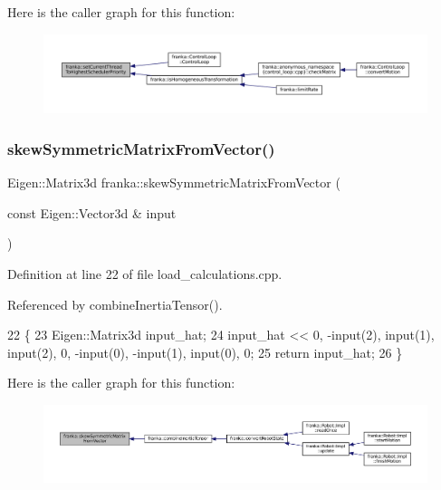 Here is the caller graph for this function\+:
\nopagebreak
\begin{figure}[H]
\begin{center}
\leavevmode
\includegraphics[width=350pt]{namespacefranka_a5c090196bc50ead82194d3e594e61e65_icgraph}
\end{center}
\end{figure}
\mbox{\label{namespacefranka_a503ad33c66091a201a92c1262778d16f}} 
\subsubsection{\texorpdfstring{skew\+Symmetric\+Matrix\+From\+Vector()}{skewSymmetricMatrixFromVector()}}
{\footnotesize\ttfamily Eigen\+::\+Matrix3d franka\+::skew\+Symmetric\+Matrix\+From\+Vector (\begin{DoxyParamCaption}\item[{const Eigen\+::\+Vector3d \&}]{input }\end{DoxyParamCaption})}



Definition at line 22 of file load\+\_\+calculations.\+cpp.



Referenced by combine\+Inertia\+Tensor().


\begin{DoxyCode}
22                                                                         \{
23   Eigen::Matrix3d input\_hat;
24   input\_hat << 0, -input(2), input(1), input(2), 0, -input(0), -input(1), input(0), 0;
25   \textcolor{keywordflow}{return} input\_hat;
26 \}
\end{DoxyCode}
Here is the caller graph for this function\+:
\nopagebreak
\begin{figure}[H]
\begin{center}
\leavevmode
\includegraphics[width=350pt]{namespacefranka_a503ad33c66091a201a92c1262778d16f_icgraph}
\end{center}
\end{figure}


